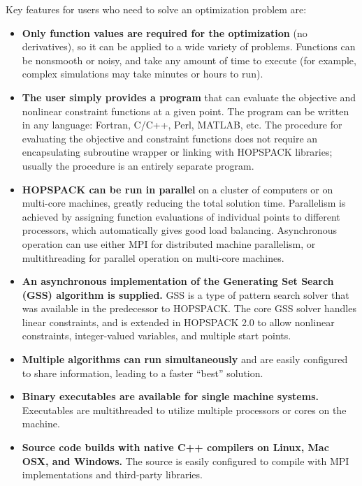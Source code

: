 \medskip
\noindent
Key features for users who need to solve an optimization problem are:
\begin{itemize}
  \item  {\bf Only function values are required for the optimization}
         (no derivatives),
         so it can be applied to a wide variety of problems.  Functions can
         be nonsmooth or noisy, and take any amount of time to execute
         (for example, complex simulations may take minutes or hours to run).
  \item  {\bf The user simply provides a program} that can evaluate the objective
         and nonlinear constraint functions at a given point.  The program
         can be written in any language: Fortran, C/C++, Perl, MATLAB, etc.
         The procedure for evaluating the objective and constraint functions
         does not require an encapsulating subroutine wrapper or linking with
         HOPSPACK libraries; usually the procedure is an entirely separate
         program.
  \item  {\bf HOPSPACK can be run in parallel} on a cluster of computers or on
         multi-core machines, greatly
         reducing the total solution time.  Parallelism is achieved by assigning
         function evaluations of individual points to different processors,
         which automatically gives good load balancing.
         Asynchronous operation can use either MPI for distributed machine
         parallelism, or multithreading for parallel operation on multi-core
         machines.
  \item  {\bf An asynchronous implementation of the Generating Set Search (GSS)
         algorithm is supplied.}  GSS is a type of pattern search solver
         that was available in the predecessor to HOPSPACK.  The core GSS
         solver handles linear constraints, and is extended in HOPSPACK 2.0
         to allow nonlinear constraints,
         integer-valued variables, and multiple start points.
  \item  {\bf Multiple algorithms can run simultaneously} and are easily
         configured to share information, leading to a faster ``best'' solution.
  \item  {\bf Binary executables are available for single machine systems.}
         Executables are multithreaded to utilize multiple processors or cores
         on the machine.
  \item  {\bf Source code builds with native C++ compilers on
         Linux, Mac OSX, and Windows.}  The source is easily configured
         to compile with MPI implementations and third-party libraries.
\end{itemize}

